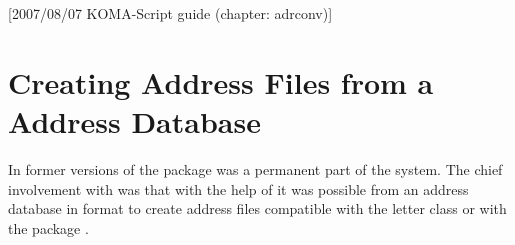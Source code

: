%
%
%
%
%
%
%
%
% 
%
%
%
%

[2007/08/07 KOMA-Script guide (chapter:
  adrconv)]

\chapter{Creating Address Files from a Address Database}%
%
%
%

In former versions of {\KOMAScript} the package  was
a permanent part of the {\KOMAScript} system.  The chief involvement
with {\KOMAScript} was that with the help of  it was
possible from an address database in {\BibTeX} format to create
address files compatible with the {\KOMAScript} letter class or with
the package .

